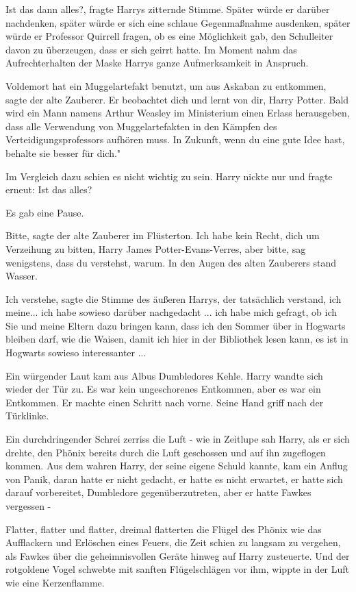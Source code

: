 \glqq Ist das dann alles?\grqq{}, fragte Harrys zitternde Stimme. Später würde
er darüber nachdenken, später würde er sich eine schlaue Gegenmaßnahme
ausdenken, später würde er Professor Quirrell fragen, ob es eine Möglichkeit
gab, den Schulleiter davon zu überzeugen, dass er sich geirrt hatte. Im Moment
nahm das Aufrechterhalten der Maske Harrys ganze Aufmerksamkeit in Anspruch.

\glqq Voldemort hat ein Muggelartefakt benutzt, um aus Askaban zu
entkommen\grqq{}, sagte der alte Zauberer. \glqq Er beobachtet dich und lernt
von dir, Harry Potter. Bald wird ein Mann namens Arthur Weasley im Ministerium
einen Erlass herausgeben, dass alle Verwendung von Muggelartefakten in den
Kämpfen des Verteidigungsprofessors aufhören muss. In Zukunft, wenn du eine gute
Idee hast, behalte sie besser für dich."

Im Vergleich dazu schien es nicht wichtig zu sein. Harry nickte nur und fragte
erneut: \glqq Ist das alles?\grqq{}

Es gab eine Pause.

\glqq Bitte\grqq{}, sagte der alte Zauberer im Flüsterton. \glqq Ich habe kein
Recht, dich um Verzeihung zu bitten, Harry James Potter-Evans-Verres, aber
bitte, sag wenigstens, dass du verstehst, warum.\grqq{} In den Augen des alten
Zauberers stand Wasser.

\glqq Ich verstehe\grqq{}, sagte die Stimme des äußeren Harrys, der tatsächlich
verstand, \glqq ich meine... ich habe sowieso darüber nachgedacht ... ich habe
mich gefragt, ob ich Sie und meine Eltern dazu bringen kann, dass ich den Sommer
über in Hogwarts bleiben darf, wie die Waisen, damit ich hier in der Bibliothek
lesen kann, es ist in Hogwarts sowieso interessanter ...\grqq{}

Ein würgender Laut kam aus Albus Dumbledores Kehle. Harry wandte sich wieder der
Tür zu. Es war kein ungeschorenes Entkommen, aber es war ein Entkommen. Er
machte einen Schritt nach vorne. Seine Hand griff nach der Türklinke.

Ein durchdringender Schrei zerriss die Luft - wie in Zeitlupe sah Harry, als er
sich drehte, den Phönix bereits durch die Luft geschossen und auf ihn zugeflogen
kommen. Aus dem wahren Harry, der seine eigene Schuld kannte, kam ein Anflug von
Panik, daran hatte er nicht gedacht, er hatte es nicht erwartet, er hatte sich
darauf vorbereitet, Dumbledore gegenüberzutreten, aber er hatte Fawkes vergessen
-

Flatter, flatter und flatter, dreimal flatterten die Flügel des Phönix wie das
Aufflackern und Erlöschen eines Feuers, die Zeit schien zu langsam zu vergehen,
als Fawkes über die geheimnisvollen Geräte hinweg auf Harry zusteuerte. Und der
rotgoldene Vogel schwebte mit sanften Flügelschlägen vor ihm, wippte in der Luft
wie eine Kerzenflamme.

